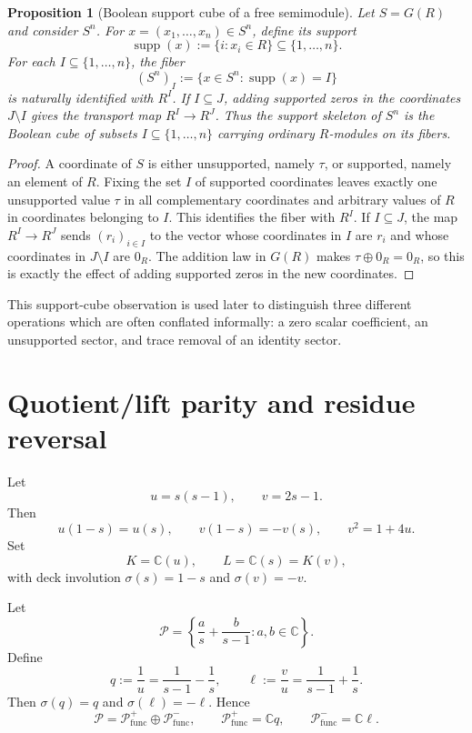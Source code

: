 \documentclass[11pt]{article}
\newtheorem{proposition}[theorem]{Proposition}
\newcommand{\C}{\mathbb C}
\newcommand{\func}{\operatorname{func}}
\begin{document}
\begin{proposition}[Boolean support cube of a free semimodule]
Let $S=G(R)$ and consider $S^n$.  For $x=(x_1,\dots,x_n)\in S^n$, define its support
\[
\operatorname{supp}(x):=\{i:x_i\in R\}\subseteq\{1,\dots,n\}.
\]
For each $I\subseteq\{1,\dots,n\}$, the fiber
\[
(S^n)_I:=\{x\in S^n: \operatorname{supp}(x)=I\}
\]
is naturally identified with $R^I$.  If $I\subseteq J$, adding supported zeros in the
coordinates $J\setminus I$ gives the transport map $R^I\to R^J$.  Thus the support
skeleton of $S^n$ is the Boolean cube of subsets $I\subseteq\{1,\dots,n\}$ carrying
ordinary $R$-modules on its fibers.
\end{proposition}

\begin{proof}
A coordinate of $S$ is either unsupported, namely $\tau$, or supported, namely an
element of $R$.  Fixing the set $I$ of supported coordinates leaves exactly one
unsupported value $\tau$ in all complementary coordinates and arbitrary values of $R$
in coordinates belonging to $I$.  This identifies the fiber with $R^I$.
If $I\subseteq J$, the map $R^I\to R^J$ sends $(r_i)_{i\in I}$ to the vector whose
coordinates in $I$ are $r_i$ and whose coordinates in $J\setminus I$ are $0_R$.
The addition law in $G(R)$ makes $\tau\oplus 0_R=0_R$, so this is exactly the effect
of adding supported zeros in the new coordinates.
\end{proof}

This support-cube observation is used later to distinguish three different operations
which are often conflated informally: a zero scalar coefficient, an unsupported sector,
and trace removal of an identity sector.

\section{Quotient/lift parity and residue reversal}

Let
\[
u=s(s-1),\qquad v=2s-1.
\]
Then
\[
u(1-s)=u(s),\qquad v(1-s)=-v(s),\qquad v^2=1+4u.
\]
Set
\[
K=\C(u),\qquad L=\C(s)=K(v),
\]
with deck involution $\sigma(s)=1-s$ and $\sigma(v)=-v$.

Let
\[
\mathcal P=\left\{\frac a s+\frac b{s-1}:a,b\in\C\right\}.
\]
Define
\[
q:=\frac1u=\frac1{s-1}-\frac1s,
\qquad
\ell:=\frac vu=\frac1{s-1}+\frac1s.
\]
Then $\sigma(q)=q$ and $\sigma(\ell)=-\ell$.  Hence
\[
\mathcal P=\mathcal P^+_{\func}\oplus\mathcal P^-_{\func},
\qquad
\mathcal P^+_{\func}=\C q,
\qquad
\mathcal P^-_{\func}=\C\ell.
\]
\end{document}
